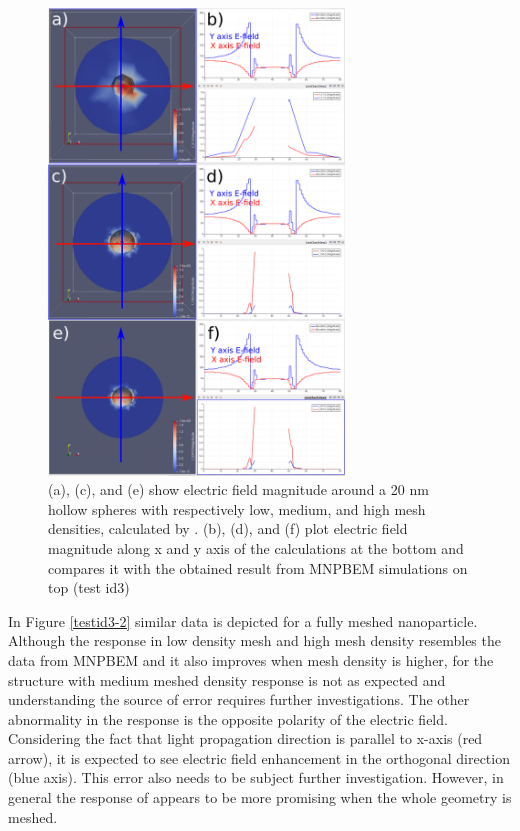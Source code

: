 \documentclass[12pt, titlepage]{article}
\begin{document}
\begin{enumerate}
    \begin{figure} \centering \includegraphics[width=0.7\textwidth]{testid3-shell.png}
    	\caption{(a), (c), and (e) show electric field magnitude around a 20 nm hollow spheres with respectively low, medium, and high mesh densities, calculated by \progname{}. (b), (d), and (f) plot electric field magnitude along x and y axis of the \progname{} calculations at the bottom and compares it with the obtained result from MNPBEM simulations on top (test id3)} \label{testid3-1} 
    \end{figure}

    In Figure \ref{testid3-2} similar data is depicted for a fully meshed nanoparticle. Although the response in low density mesh and high mesh density resembles the data from MNPBEM and it also improves when mesh density is higher, for the structure with medium meshed density response is not as expected and understanding the source of error requires further investigations. The other abnormality in the \progname{} response is the opposite polarity of the electric field. Considering the fact that light propagation direction is parallel to x-axis (red arrow), it is expected to see electric field enhancement in the orthogonal direction (blue axis). This error also needs to be subject further investigation. However, in general the response of \progname appears to be more promising when the whole geometry is meshed. 


\end{enumerate}
\end{document}
